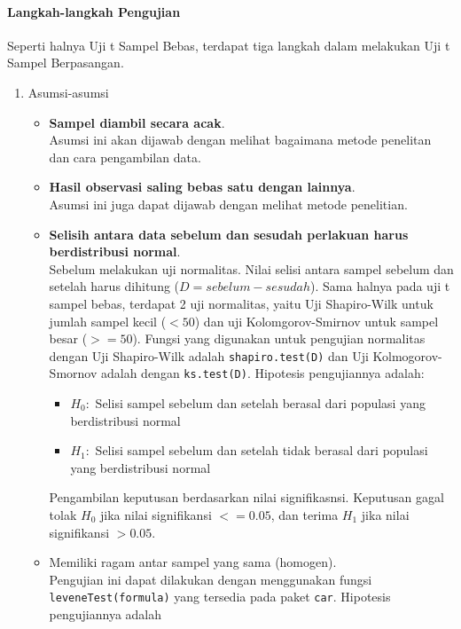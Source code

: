\documentclass[
]{book}
\providecommand{\tightlist}{%
  \setlength{\itemsep}{0pt}\setlength{\parskip}{0pt}}
\begin{document}
\hypertarget{langkah-langkah-pengujian-2}{%
\paragraph{Langkah-langkah Pengujian}\label{langkah-langkah-pengujian-2}}

Seperti halnya Uji t Sampel Bebas, terdapat tiga langkah dalam melakukan Uji t Sampel Berpasangan.

\begin{enumerate}
\def\labelenumi{\arabic{enumi}.}
\item
  Asumsi-asumsi

  \begin{itemize}
  \item
    \textbf{Sampel diambil secara acak}.\\
    Asumsi ini akan dijawab dengan melihat bagaimana metode penelitan dan cara pengambilan data.
  \item
    \textbf{Hasil observasi saling bebas satu dengan lainnya}.\\
    Asumsi ini juga dapat dijawab dengan melihat metode penelitian.
  \item
    \textbf{Selisih antara data sebelum dan sesudah perlakuan harus berdistribusi normal}.\\
    Sebelum melakukan uji normalitas. Nilai selisi antara sampel sebelum dan setelah harus dihitung (\(D = sebelum - sesudah\)). Sama halnya pada uji t sampel bebas, terdapat 2 uji normalitas, yaitu Uji Shapiro-Wilk untuk jumlah sampel kecil (\(< 50\)) dan uji Kolomgorov-Smirnov untuk sampel besar (\(>= 50\)). Fungsi yang digunakan untuk pengujian normalitas dengan Uji Shapiro-Wilk adalah \texttt{shapiro.test(D)} dan Uji Kolmogorov-Smornov adalah dengan \texttt{ks.test(D)}. Hipotesis pengujiannya adalah:

    \begin{itemize}
    \tightlist
    \item
      \(H_0 :\) Selisi sampel sebelum dan setelah berasal dari populasi yang berdistribusi normal
    \item
      \(H_1 :\) Selisi sampel sebelum dan setelah tidak berasal dari populasi yang berdistribusi normal
    \end{itemize}

    Pengambilan keputusan berdasarkan nilai signifikasnsi. Keputusan gagal tolak \(H_0\) jika nilai signifikansi \(<= 0.05\), dan terima \(H_1\) jika nilai signifikansi \(> 0.05\).
  \item
    Memiliki ragam antar sampel yang sama (homogen).\\
    Pengujian ini dapat dilakukan dengan menggunakan fungsi \texttt{leveneTest(formula)} yang tersedia pada paket \texttt{car}. Hipotesis pengujiannya adalah


\end{itemize}
\end{enumerate}
\end{document}
